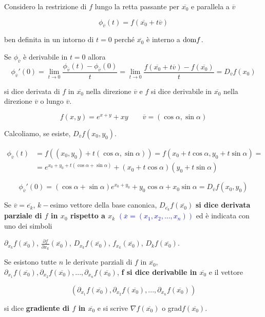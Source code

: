 Considero la restrizione di $f$ lungo la retta passante per $\overline{x_0}$ e parallela a $\overline{v}$

$$\phi_{\overline{v}}(t)=f(\overline{x_0}+t\overline{v})$$

ben definita in un intorno di $t=0$ perché $\overline{x_0}$ è interno a $\mathrm{dom} f$.


\begin{definition}
	Se $\phi_{\overline{v}}$ è derivabile in $t=0$ allora 
	\begin{equation*}
		\phi_{\overline{v}}'(0)=\lim_{t\rightarrow0}\frac{\phi_{\overline{v}}(t)-\phi_{\overline{v}}(0)}{t}=\lim_{t\rightarrow 0}\frac{f(\overline{x_0}+t\overline{v})-f(\overline{x_0})}{t}=D_{\overline{v}}f(x_0)
	\end{equation*}
	
	si dice derivata di $f$ in $\overline{x_0}$ nella direzione $\overline{v}$ e $f$ si dice derivabile in $\overline{x_0}$ nella direzione $\overline{v}$ o lungo $\overline{v}$.
\end{definition}


\begin{exbar}
	$$f(x,y)=e^{x+y}+xy \qquad \overline{v}=(\cos\alpha,\sin\alpha)$$
	
	Calcoliamo, se esiste, $D_{\overline{v}}f(x_0,y_0)$.
	
	\begin{align*} 
		\phi_{\overline{v}}(t) &=f((x_0,y_0)+t(\cos\alpha,\sin\alpha)) =f(x_0+t\cos\alpha,y_0+t\sin\alpha)=
		\\
		&=e^{x_0+y_0+t(\cos\alpha+\sin\alpha)}+(x_0+t\cos\alpha)(y_0+t\sin\alpha)
	\end{align*}
	
	$$\phi_{\overline{v}}'(0)=(\cos\alpha+\sin\alpha)e^{x_0+y_0}+y_0\cos\alpha+x_0\sin\alpha=D_{\overline{v}}f(x_0,y_0)$$
\end{exbar}


\begin{definition}
	Se $\overline{v}=\overline{e_k}$, $k-$esimo vettore della base canonica, $D_{\overline{e_k}}f(\overline{x_0})$ \textbf{si dice derivata parziale di $f$ in $x_0$ rispetto a $x_k$} \textcolor{blue}{$(\overline{x}=(x_1,x_2,...,x_n))$} ed è indicata con uno dei simboli 
	
	$\partial_{x_k}f(\overline{x_0})$, $\frac{\partial f}{\partial x_k}(\overline{x_0})$, $D_{x_k}f(\overline{x_0})$, $f_{x_k}(\overline{x_0})$, $D_kf(\overline{x_0})$.
	
	Se esistono tutte $n$ le derivate parziali di $f$ in $\overline{x_0}$, $\partial_{x_1}f(\overline{x_0}),\partial_{x_2}f(\overline{x_0}),...,\partial_{x_n}f(\overline{x_0})$, \textbf{f si dice derivabile in $\overline{x_0}$} e il vettore 
	
	$$(\partial_{x_1}f(\overline{x_0}),\partial_{x_2}f(\overline{x_0}),...,\partial_{x_n}f(\overline{x_0}))$$
	
	si dice \textbf{gradiente di $f$ in $\overline{x_0}$} e si scrive $\nabla f(\overline{x_0})$ o grad$f(\overline{x_0})$.
\end{definition}


